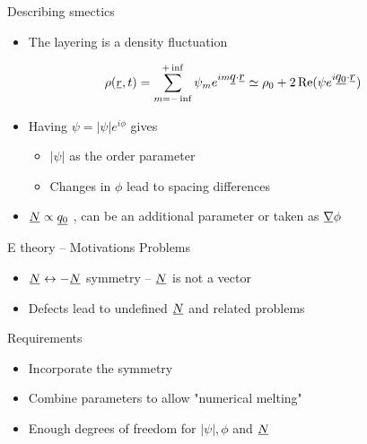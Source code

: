 \documentclass[10pt,notes]{beamer}
\newcommand{\suf}[2]{\stackunder[0.5pt]{\stackunder[1pt]{\ensuremath{#1}}{\rule{\widthof{\ensuremath{#2}}*\real{0.9}}{.1ex}}}{}}
\newcommand{\su}[1]{\suf{#1}{#1}}
\begin{document}
\begin{frame}[fragile]{Describing smectics}
    \newrefsection
    \begin{itemize}
        \item The layering is a density fluctuation
    \end{itemize}
    \begin{align*}
        \rho(\su{r}, t) = \sum_{m=-\inf}^{+\inf} \psi_m e^{im\su{q}\cdot\su{r}} \simeq \rho_0 + 2\Re(\psi e^{i\su{q_0}\cdot\su{r}})
    \end{align*}
    \begin{itemize}
        \item Having $\psi = |\psi|e^{i\phi}$ gives
            \begin{itemize}
                \item $|\psi|$ as the order parameter
                \item Changes in $\phi$ lead to spacing differences
            \end{itemize}
        \item $\su{N} \propto \su{q_0}$ \color{gray}, can be an additional parameter or taken as $\su{\nabla} \phi$ \normalcolor
    \end{itemize}
\end{frame}

\begin{frame}[fragile]{E theory -- Motivations}
    \newrefsection
    \large
    Problems
    \normalsize
    \begin{itemize}
        \item $\su{N} \leftrightarrow -\su{N}$ symmetry -- $\su{N}$ is not a vector
        \item Defects lead to undefined $\su{N}$ \color{gray} and related problems \normalcolor
    \end{itemize}

    \vspace{3em}

    \large
    Requirements
    \normalsize
    \begin{itemize}
        \item Incorporate the symmetry
        \item Combine parameters to allow "numerical melting"
        \item Enough degrees of freedom for $|\psi|, \phi$ and $\su{N}$
    \end{itemize}
\end{frame}
\end{document}
